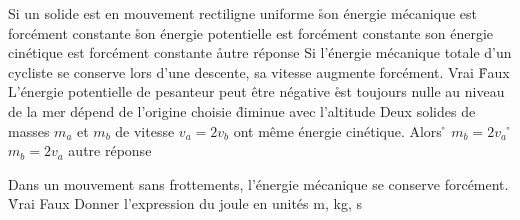\q
Si un solide est en mouvement rectiligne uniforme
\r
son énergie mécanique est forcément constante
\r
son énergie potentielle est forcément constante
\rv
son énergie cinétique est forcément constante
\r
autre réponse
\q
Si l'énergie mécanique totale d'un cycliste se conserve lors d'une descente, sa vitesse augmente forcément.
\rv
Vrai
\r
Faux
\q
L'énergie potentielle de pesanteur 
\rv
peut être négative
\r
est toujours nulle au niveau de la mer
\rv
dépend de l'origine choisie
\r
diminue avec l'altitude
\q
Deux solides de masses $m_a$ et $m_b$ de vitesse $v_a = 2 v_b$ ont même énergie cinétique. Alors
\r
$m_b = 2 v_a$
\r
$m_b = 2 v_a$
\rv
autre réponse
  
\q
Dans un mouvement sans frottements, l'énergie mécanique se conserve forcément.
\r
Vrai
\rv
Faux
\q
Donner l'expression du joule en unités m, kg, s

